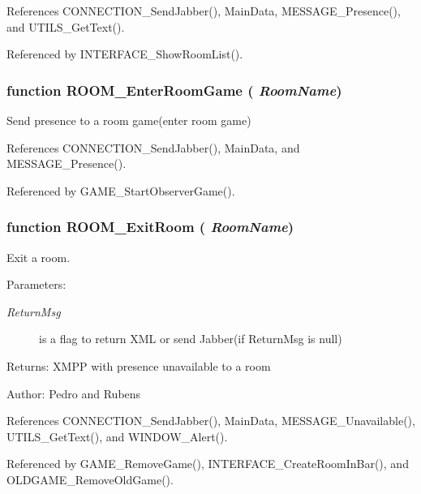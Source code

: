 References CONNECTION\_\-SendJabber(), MainData, MESSAGE\_\-Presence(), and UTILS\_\-GetText().

Referenced by INTERFACE\_\-ShowRoomList().
\subsubsection{\setlength{\rightskip}{0pt plus 5cm}function ROOM\_\-EnterRoomGame ( {\em RoomName})}\label{room_2room_8js_3f6ec5d9a44f7bc914bf2b25eb786707}


Send presence to a room game(enter room game) 

References CONNECTION\_\-SendJabber(), MainData, and MESSAGE\_\-Presence().

Referenced by GAME\_\-StartObserverGame().
\subsubsection{\setlength{\rightskip}{0pt plus 5cm}function ROOM\_\-ExitRoom ( {\em RoomName})}\label{room_2room_8js_d64107f06cd835aba1e8cfe7eb256b21}


Exit a room. \begin{Desc}
\item[Parameters:]
\begin{description}
\item[{\em ReturnMsg}]is a flag to return XML or send Jabber(if ReturnMsg is null) \end{description}
\end{Desc}
\begin{Desc}
\item[Returns:]XMPP with presence unavailable to a room \end{Desc}
\begin{Desc}
\item[Author:]Pedro and Rubens \end{Desc}


References CONNECTION\_\-SendJabber(), MainData, MESSAGE\_\-Unavailable(), UTILS\_\-GetText(), and WINDOW\_\-Alert().

Referenced by GAME\_\-RemoveGame(), INTERFACE\_\-CreateRoomInBar(), and OLDGAME\_\-RemoveOldGame().
